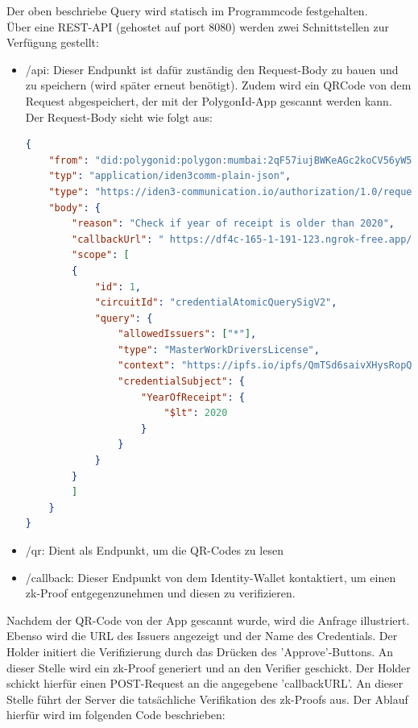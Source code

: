 Der oben beschriebe Query wird statisch im Programmcode festgehalten. \\
Über eine REST-API (gehostet auf port 8080) werden zwei Schnittstellen zur Verfügung gestellt:
\begin{itemize}
	\item /api: Dieser Endpunkt ist dafür zuständig den Request-Body zu bauen und zu speichern (wird später erneut benötigt). Zudem wird ein QRCode von dem Request abgespeichert, der mit der PolygonId-App gescannt werden kann. Der Request-Body sieht wie folgt aus:
	
\begin{lstlisting}[language=json,firstnumber=1]
{
	"from": "did:polygonid:polygon:mumbai:2qF57iujBWKeAGc2koCV56yW5S1SfPtFsCgDHzGRdW",
	"typ": "application/iden3comm-plain-json",
	"type": "https://iden3-communication.io/authorization/1.0/request",
	"body": {
		"reason": "Check if year of receipt is older than 2020",
		"callbackUrl": " https://df4c-165-1-191-123.ngrok-free.app/api/callback?sessionId=1",
		"scope": [
		{
			"id": 1,
			"circuitId": "credentialAtomicQuerySigV2",
			"query": {
				"allowedIssuers": ["*"],
				"type": "MasterWorkDriversLicense",
				"context": "https://ipfs.io/ipfs/QmTSd6saivXHysRopQdM1yswp2qyFwobL7fwuFpkVTS8gd",
				"credentialSubject": {
					"YearOfReceipt": {
						"$lt": 2020
					}
				}
			}
		}
		]
	}
}
\end{lstlisting}	
	\item /qr: Dient als Endpunkt, um die QR-Codes zu lesen
	\item /callback: Dieser Endpunkt von dem Identity-Wallet kontaktiert, um einen zk-Proof entgegenzunehmen und diesen zu verifizieren.
\end{itemize}
Nachdem der QR-Code von der App gescannt wurde, wird die Anfrage illustriert. Ebenso wird die URL des Issuers angezeigt und der Name des Credentials. Der Holder initiert die Verifizierung durch das Drücken des 'Approve'-Buttons. An dieser Stelle wird ein zk-Proof generiert und an den Verifier geschickt. Der Holder schickt hierfür einen POST-Request an die angegebene 'callbackURL'. An dieser Stelle führt der Server die tatsächliche Verifikation des zk-Proofs aus. Der Ablauf hierfür wird im folgenden Code beschrieben: \\ \\
